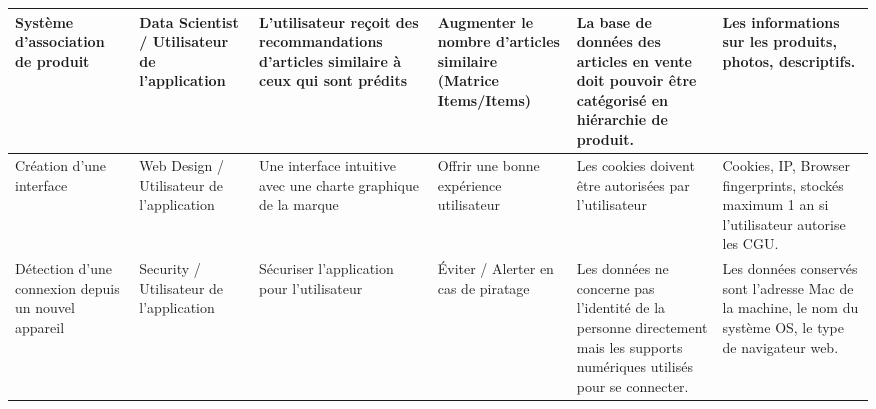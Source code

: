 \documentclass[12pt]{article}
\begin{document}
\begin{landscape}
\begin{table}[H]
\begin{tabular}{p{3cm}p{3cm}p{4cm}p{4cm}p{4cm}p{4cm}}
\hline   Système d’association de produit \cellcolor{gray!15}& Data Scientist / Utilisateur de l’application \cellcolor{gray!15}& L’utilisateur reçoit des recommandations d’articles similaire à ceux qui sont prédits \cellcolor{gray!15}& Augmenter le nombre d’articles similaire (Matrice Items/Items) \cellcolor{gray!15}& La base de données des articles en vente doit pouvoir être catégorisé en hiérarchie de produit. \cellcolor{gray!15}& Les informations sur les produits, photos, descriptifs. \cellcolor{gray!15}\\
\hline   Création d’une interface & Web Design / Utilisateur de l’application & Une interface intuitive avec une charte graphique de la marque & Offrir une bonne expérience utilisateur & Les cookies doivent être autorisées par l’utilisateur & Cookies, IP, Browser fingerprints, stockés maximum 1 an si l’utilisateur autorise les CGU. \\
\hline   Détection d’une connexion depuis un nouvel appareil \cellcolor{gray!15}& Security / Utilisateur de l’application \cellcolor{gray!15}& Sécuriser l’application pour l’utilisateur\cellcolor{gray!15} & Éviter / Alerter en cas de piratage \cellcolor{gray!15}& Les données ne concerne pas l’identité de la personne directement mais les supports numériques utilisés pour se connecter. \cellcolor{gray!15}& Les données conservés sont l’adresse Mac de la machine, le nom du système OS, le type de navigateur web. \cellcolor{gray!15}\\



\hline
\end{tabular}
\label{backlog}
\end{table}
\end{landscape}
\end{document}

